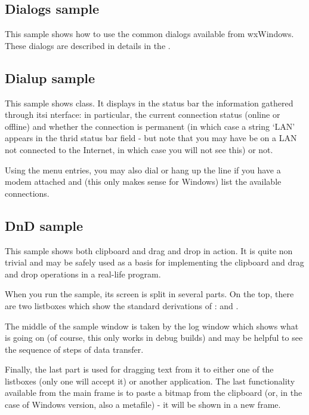 \subsection{Dialogs sample}\label{sampledialogs}

This sample shows how to use the common dialogs available from wxWindows. These
dialogs are described in details in the .

\subsection{Dialup sample}\label{sampledialup}

This sample shows  
class. It displays in the status bar the information gathered through itsi
nterface: in particular, the current connection status (online or offline) and
whether the connection is permanent (in which case a string `LAN' appears in
the thrid status bar field - but note that you may have be on a LAN not
connected to the Internet, in which case you will not see this) or not.

Using the menu entries, you may also dial or hang up the line if you have a
modem attached and (this only makes sense for Windows) list the available
connections.

\subsection{DnD sample}\label{samplednd}

This sample shows both clipboard and drag and drop in action. It is quite non
trivial and may be safely used as a basis for implementing the clipboard and
drag and drop operations in a real-life program.

When you run the sample, its screen is split in several parts. On the top,
there are two listboxes which show the standard derivations of 
: 
 and 
.

The middle of the sample window is taken by the log window which shows what is
going on (of course, this only works in debug builds) and may be helpful to see
the sequence of steps of data transfer.

Finally, the last part is used for dragging text from it to either one of the
listboxes (only one will accept it) or another application. The last
functionality available from the main frame is to paste a bitmap from the
clipboard (or, in the case of Windows version, also a metafile) - it will be
shown in a new frame.

